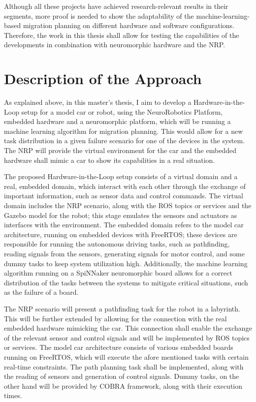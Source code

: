 Although all these projects have achieved research-relevant results in their segments, more proof is needed to show the adaptability of the machine-learning-based migration planning on different hardware and software configurations. Therefore, the work in this thesis shall allow for testing the capabilities of the developments in combination with neuromorphic hardware and the NRP.

\chapter{Description of the Approach}\label{chapter:descriptionapproach}
As explained above, in this master’s thesis, I aim to develop a Hardware-in-the-Loop setup for a model car or robot, using the NeuroRobotics Platform, embedded hardware and a neuromorphic platform, which will be running a machine learning algorithm for migration planning. This would allow for a new task distribution in a given failure scenario for one of the devices in the system. The NRP will provide the virtual environment for the car and the embedded hardware shall mimic a car to show its capabilities in a real situation.

The proposed Hardware-in-the-Loop setup consists of a virtual domain and a real, embedded domain, which interact with each other through the exchange of important information, such as sensor data and control commands. The virtual domain includes the NRP scenario, along with the ROS topics or services and the Gazebo model for the robot; this stage emulates the sensors and actuators as interfaces with the environment. The embedded domain refers to the model car architecture, running on embedded devices with FreeRTOS; these devices are responsible for running the autonomous driving tasks, such as pathfinding, reading signals from the sensors, generating signals for motor control, and some dummy tasks to keep system utilization high. Additionally, the machine learning algorithm running on a SpiNNaker neuromorphic board allows for a correct distribution of the tasks between the systems to mitigate critical situations, such as the failure of a board.

The NRP scenario will present a pathfinding task for the robot in a labyrinth. This will be further extended by allowing for the connection with the real embedded hardware mimicking the car. This connection shall enable the exchange of the relevant sensor and control signals and will be implemented by ROS topics or services.
The model car architecture consists of various embedded boards running on FreeRTOS, which will execute the afore mentioned tasks with certain real-time constraints. The path planning task shall be implemented, along with the reading of sensors and generation of control signals. Dummy tasks, on the other hand will be provided by COBRA framework, along with their execution times. 

